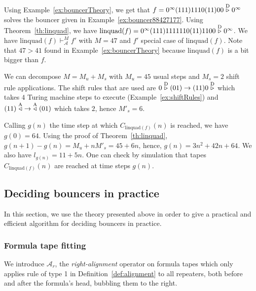 
\begin{example}\label{ex:linquad}
    Using Example~\ref{ex:bouncerTheory}, we get that $f = 0^\infty (111)1110(11)00\stackrel{\text{D}}\triangleright0^\infty$ solves the bouncer given in Example~\ref{ex:bouncer88427177}. Using Theorem~\ref{th:linquad}, we have $\text{linquad}(f)= 0^\infty (111)1111110(11)11 00\stackrel{\text{D}}\triangleright0^\infty$.
    We have $\text{linquad}(f) \vdash_\mathcal{A}^{M} f'$ with $M = 47$ and $f'$ special case of $\text{linquad}(f)$. Note that $47 > 41$ found in Example~\ref{ex:bouncerTheory} because $\text{linquad}(f)$ is a bit bigger than $f$.

    We can decompose $M = M_u + M_s$ with $M_u = 45$ usual steps and $M_s = 2$ shift rule applications. The shift rules that are used are $0 \stackrel{\text{D}}\triangleright(01) \to (11)0\stackrel{\text{D}}\triangleright$ which takes $4$ Turing machine steps to execute (Example~\ref{ex:shiftRules}) and $(11) \stackrel{\text{A}}\triangleleft\; \to \;  \stackrel{\text{A}}\triangleleft (01)$ which takes $2$, hence $M'_s = 6$.

    Calling $g(n)$ the time step at which $C_{\text{linquad}(f)}(n)$ is reached, we have $g(0)= 64$. Using the proof of Theorem~\ref{th:linquad}, $g(n+1)-g(n) = M_u + n M'_s = 45 + 6n$, hence, $g(n) = 3n^2 + 42n + 64$. We also have $l_{g(n)} = 11 + 5n$. One can check by simulation that tapes $C_{\text{linquad}(f)}(n)$ are reached at time steps $g(n)$.


\end{example}
\newpage
\subsection{Deciding bouncers in practice}\label{sec:bouncers-algo}

In this section, we use the theory presented above in order to give a practical and efficient algorithm for deciding bouncers in practice.

\subsubsection{Formula tape fitting}


We introduce $\mathcal{A}_r$, the \textit{right-alignment} operator on formula tapes which only applies rule of type 1 in Definition~\ref{def:alignment} to all repeaters, both before and after the formula's head, bubbling them to the right.


